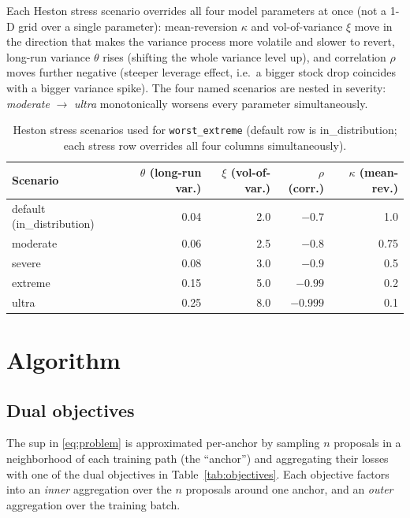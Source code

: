 \documentclass[11pt]{article}
\begin{document}
Each Heston stress scenario overrides all four model parameters at once (not a 1-D grid over a
single parameter): mean-reversion $\kappa$ and vol-of-variance $\xi$ move in the direction that
makes the variance process more volatile and slower to revert, long-run variance $\theta$ rises
(shifting the whole variance level up), and correlation $\rho$ moves further negative (steeper
leverage effect, i.e.\ a bigger stock drop coincides with a bigger variance spike). The four
named scenarios are nested in severity: \emph{moderate} $\to$ \emph{ultra} monotonically worsens
every parameter simultaneously.

\begin{table}[h]
  \centering
  \caption{Heston stress scenarios used for \texttt{worst\_extreme} (default row is
  in\_distribution; each stress row overrides all four columns simultaneously).}
  \label{tab:heston-stress}
  \small
  \begin{tabular}{@{}lrrrr@{}}
    \toprule
    Scenario & $\theta$ (long-run var.) & $\xi$ (vol-of-var.) & $\rho$ (corr.) & $\kappa$ (mean-rev.) \\
    \midrule
    default (in\_distribution) & 0.04 & 2.0 & $-0.7$ & 1.0 \\
    moderate & 0.06 & 2.5 & $-0.8$ & 0.75 \\
    severe   & 0.08 & 3.0 & $-0.9$ & 0.5 \\
    extreme  & 0.15 & 5.0 & $-0.99$ & 0.2 \\
    ultra    & 0.25 & 8.0 & $-0.999$ & 0.1 \\
    \bottomrule
  \end{tabular}
\end{table}

\section{Algorithm}

\subsection{Dual objectives}

The sup in \eqref{eq:problem} is approximated per-anchor by sampling $n$ proposals in a
neighborhood of each training path (the ``anchor'') and aggregating their losses with one of the
dual objectives in Table~\ref{tab:objectives}. Each objective factors into an \emph{inner}
aggregation over the $n$ proposals around one anchor, and an \emph{outer} aggregation over the
training batch.
\end{document}
